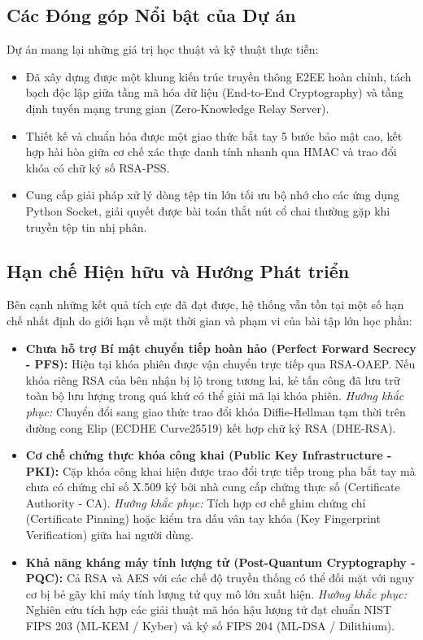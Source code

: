 \documentclass[a4paper,12pt]{article}
\begin{document}
\subsection{Các Đóng góp Nổi bật của Dự án}
Dự án mang lại những giá trị học thuật và kỹ thuật thực tiễn:
\begin{itemize}
    \item Đã xây dựng được một khung kiến trúc truyền thông E2EE hoàn chỉnh, tách bạch độc lập giữa tầng mã hóa dữ liệu (End-to-End Cryptography) và tầng định tuyến mạng trung gian (Zero-Knowledge Relay Server).
    \item Thiết kế và chuẩn hóa được một giao thức bắt tay 5 bước bảo mật cao, kết hợp hài hòa giữa cơ chế xác thực danh tính nhanh qua HMAC và trao đổi khóa có chữ ký số RSA-PSS.
    \item Cung cấp giải pháp xử lý dòng tệp tin lớn tối ưu bộ nhớ cho các ứng dụng Python Socket, giải quyết được bài toán thắt nút cổ chai thường gặp khi truyền tệp tin nhị phân.
\end{itemize}

\subsection{Hạn chế Hiện hữu và Hướng Phát triển}
Bên cạnh những kết quả tích cực đã đạt được, hệ thống vẫn tồn tại một số hạn chế nhất định do giới hạn về mặt thời gian và phạm vi của bài tập lớn học phần:
\begin{itemize}
    \item \textbf{Chưa hỗ trợ Bí mật chuyển tiếp hoàn hảo (Perfect Forward Secrecy - PFS):} Hiện tại khóa phiên được vận chuyển trực tiếp qua RSA-OAEP. Nếu khóa riêng RSA của bên nhận bị lộ trong tương lai, kẻ tấn công đã lưu trữ toàn bộ lưu lượng trong quá khứ có thể giải mã lại khóa phiên. \textit{Hướng khắc phục:} Chuyển đổi sang giao thức trao đổi khóa Diffie-Hellman tạm thời trên đường cong Elip (ECDHE Curve25519) kết hợp chữ ký RSA (DHE-RSA).
    \item \textbf{Cơ chế chứng thực khóa công khai (Public Key Infrastructure - PKI):} Cặp khóa công khai hiện được trao đổi trực tiếp trong pha bắt tay mà chưa có chứng chỉ số X.509 ký bởi nhà cung cấp chứng thực số (Certificate Authority - CA). \textit{Hướng khắc phục:} Tích hợp cơ chế ghim chứng chỉ (Certificate Pinning) hoặc kiểm tra dấu vân tay khóa (Key Fingerprint Verification) giữa hai người dùng.
    \item \textbf{Khả năng kháng máy tính lượng tử (Post-Quantum Cryptography - PQC):} Cả RSA và AES với các chế độ truyền thống có thể đối mặt với nguy cơ bị bẻ gãy khi máy tính lượng tử quy mô lớn xuất hiện. \textit{Hướng khắc phục:} Nghiên cứu tích hợp các giải thuật mã hóa hậu lượng tử đạt chuẩn NIST FIPS 203 (ML-KEM / Kyber) và ký số FIPS 204 (ML-DSA / Dilithium).
\end{itemize}
\end{document}
